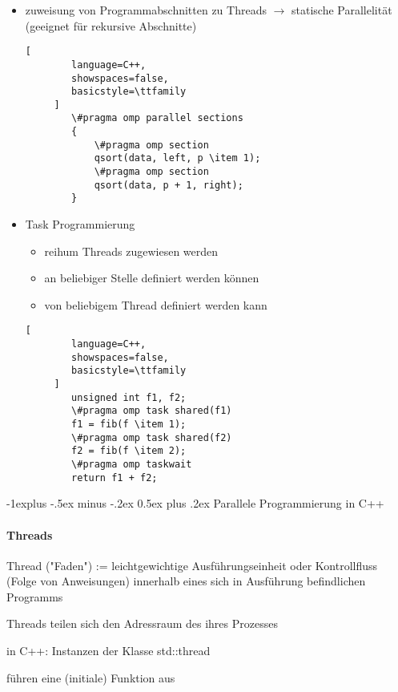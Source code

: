 \documentclass[10pt]{article}
\makeatletter
\renewcommand{\subsection}{\@startsection{subsection}{2}{0mm}%
                                {-1explus -.5ex minus -.2ex}%
                                {0.5ex plus .2ex}%
                                {\normalfont\normalsize\bfseries}}
\makeatother
\begin{document}
\begin{itemize}
\begin{itemize}
        \end{itemize}
  \item zuweisung von Programmabschnitten zu Threads $\rightarrow$ statische Parallelität (geeignet für rekursive Abschnitte)
        \begin{lstlisting}[
        language=C++,
        showspaces=false,
        basicstyle=\ttfamily
     ]
        \#pragma omp parallel sections
        {
            \#pragma omp section
            qsort(data, left, p \item 1);
            \#pragma omp section
            qsort(data, p + 1, right);
        }
    \end{lstlisting}
  \item Task Programmierung
        \begin{itemize}
          \item reihum Threads zugewiesen werden
          \item an beliebiger Stelle definiert werden können
          \item von beliebigem Thread definiert werden kann
        \end{itemize}
        \begin{lstlisting}[
        language=C++,
        showspaces=false,
        basicstyle=\ttfamily
     ]
        unsigned int f1, f2;
        \#pragma omp task shared(f1)
        f1 = fib(f \item 1);
        \#pragma omp task shared(f2)
        f2 = fib(f \item 2);
        \#pragma omp taskwait
        return f1 + f2;
    \end{lstlisting}
\end{itemize}


\subsection{Parallele Programmierung in C++}
\paragraph{Threads}
Thread ("Faden") := leichtgewichtige Ausführungseinheit oder Kontrollfluss (Folge von Anweisungen) innerhalb eines sich in Ausführung befindlichen Programms
\begin{itemize*}
  \item Threads teilen sich den Adressraum des ihres Prozesses
  \item in C++: Instanzen der Klasse std::thread
  \item führen eine (initiale) Funktion aus
\end{itemize*}
\end{document}
